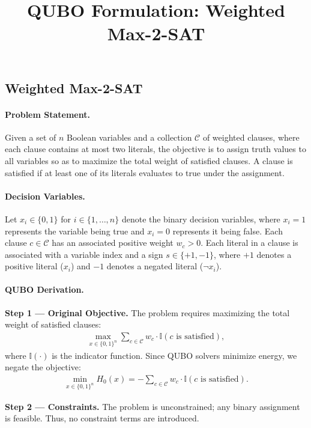 \documentclass[12pt]{article}
\title{QUBO Formulation: Weighted Max-2-SAT}
\date{}
\begin{document}
\maketitle

\subsection*{Weighted Max-2-SAT}

\paragraph{Problem Statement.}
Given a set of $n$ Boolean variables and a collection $\mathcal{C}$ of weighted clauses, where each clause contains at most two literals, the objective is to assign truth values to all variables so as to maximize the total weight of satisfied clauses. A clause is satisfied if at least one of its literals evaluates to true under the assignment.

\paragraph{Decision Variables.}
Let $x_i \in \{0,1\}$ for $i \in \{1, \dots, n\}$ denote the binary decision variables, where $x_i = 1$ represents the variable being true and $x_i = 0$ represents it being false. Each clause $c \in \mathcal{C}$ has an associated positive weight $w_c > 0$. Each literal in a clause is associated with a variable index and a sign $s \in \{+1, -1\}$, where $+1$ denotes a positive literal ($x_i$) and $-1$ denotes a negated literal ($\neg x_i$).

\paragraph{QUBO Derivation.}
\textbf{Step 1 --- Original Objective.} The problem requires maximizing the total weight of satisfied clauses:
\begin{align}
    \max_{x \in \{0,1\}^n} \sum_{c \in \mathcal{C}} w_c \cdot \mathbb{I}(c \text{ is satisfied}),
\end{align}
where $\mathbb{I}(\cdot)$ is the indicator function. Since QUBO solvers minimize energy, we negate the objective:
\begin{align}
    \min_{x \in \{0,1\}^n} H_0(x) = -\sum_{c \in \mathcal{C}} w_c \cdot \mathbb{I}(c \text{ is satisfied}).
\end{align}

\textbf{Step 2 --- Constraints.} The problem is unconstrained; any binary assignment is feasible. Thus, no constraint terms are introduced.
\end{document}
